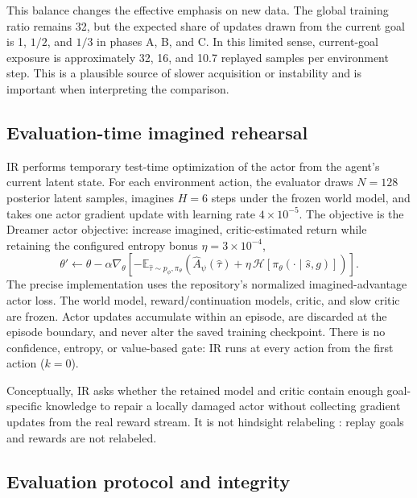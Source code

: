 \documentclass[10pt]{article}
\begin{document}
This balance changes the effective emphasis on new data. The global training ratio remains 32, but the expected share of updates drawn from the current goal is 1, $1/2$, and $1/3$ in phases A, B, and C. In this limited sense, current-goal exposure is approximately 32, 16, and 10.7 replayed samples per environment step. This is a plausible source of slower acquisition or instability and is important when interpreting the comparison.

\subsection{Evaluation-time imagined rehearsal}

IR performs temporary test-time optimization of the actor from the agent's current latent state. For each environment action, the evaluator draws $N=128$ posterior latent samples, imagines $H=6$ steps under the frozen world model, and takes one actor gradient update with learning rate $4\times10^{-5}$. The objective is the Dreamer actor objective: increase imagined, critic-estimated return while retaining the configured entropy bonus $\eta=3\times10^{-4}$,
\begin{equation}
 \theta' \leftarrow \theta-\alpha\nabla_\theta
 \left[-\mathbb E_{\hat\tau\sim p_\phi,\pi_\theta}
 \left(\widehat A_\psi(\hat\tau)+\eta\,\mathcal H[\pi_\theta(\cdot\mid \hat s,g)]\right)\right].
\end{equation}
The precise implementation uses the repository's normalized imagined-advantage actor loss. The world model, reward/continuation models, critic, and slow critic are frozen. Actor updates accumulate within an episode, are discarded at the episode boundary, and never alter the saved training checkpoint. There is no confidence, entropy, or value-based gate: IR runs at every action from the first action ($k=0$).

Conceptually, IR asks whether the retained model and critic contain enough goal-specific knowledge to repair a locally damaged actor without collecting gradient updates from the real reward stream. It is not hindsight relabeling \citep{andrychowicz2017her}: replay goals and rewards are not relabeled.

\subsection{Evaluation protocol and integrity}
\end{document}
